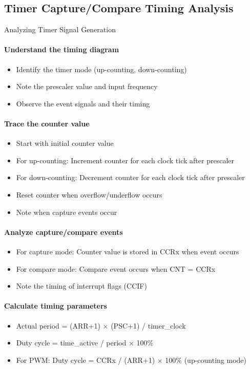 \subsection{Timer Capture/Compare Timing Analysis}

\begin{KR}{Analyzing Timer Signal Generation}
\paragraph{Understand the timing diagram}
\begin{itemize}
    \item Identify the timer mode (up-counting, down-counting)
    \item Note the prescaler value and input frequency
    \item Observe the event signals and their timing
\end{itemize}

\paragraph{Trace the counter value}
\begin{itemize}
    \item Start with initial counter value
    \item For up-counting: Increment counter for each clock tick after prescaler
    \item For down-counting: Decrement counter for each clock tick after prescaler
    \item Reset counter when overflow/underflow occurs
    \item Note when capture events occur
\end{itemize}

\paragraph{Analyze capture/compare events}
\begin{itemize}
    \item For capture mode: Counter value is stored in CCRx when event occurs
    \item For compare mode: Compare event occurs when CNT = CCRx
    \item Note the timing of interrupt flags (CCIF)
\end{itemize}

\paragraph{Calculate timing parameters}
\begin{itemize}
    \item Actual period = (ARR+1) × (PSC+1) / timer\_clock
    \item Duty cycle = time\_active / period × 100\%
    \item For PWM: Duty cycle = CCRx / (ARR+1) × 100\% (up-counting mode)
\end{itemize}
\end{KR}

